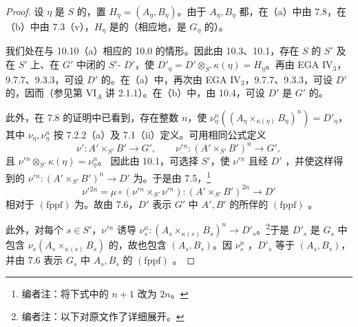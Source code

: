 \begin{proof}
设 $\eta$ 是 $S$ 的，置 $H_\eta=(A_\eta,B_\eta)$。由于 $A_\eta,B_\eta$ 都，在（a）中由 7.8，在（b）中由 7.3（v），$H_\eta$ 是的（相应地，是 $G_\eta$ 的）。

我们处在与 10.10（a）相应的 10.0 的情形。因此由 10.3、10.1，存在 $S$ 的 $S'$ 及在 $S'$ 上、在 $G'$ 中闭的 $S'$- $D'$，使 $D'_\eta=D'\otimes_{S'}\kappa(\eta)=H_\eta$。再由 EGA IV$_3$，9.7.7、9.3.3，可设 $D'$ 的。在（a）中，再次由 EGA IV$_3$，9.7.7、9.3.3，可设 $D'$ 的，因而（参见第 VI$_A$ 讲 2.1.1）。在（b）中，由 10.4，可设 $D'$ 是 $G'$ 的。

此外，在 7.8 的证明中已看到，存在整数 $n$，使 $\nu_\eta^n((A_\eta\times_{\kappa(\eta)}B_\eta)^n)=D'_\eta$，其中 $\nu_\eta,\nu_\eta^n$ 按 7.2.2（a）及 7.1（ii）定义。可用相同公式定义
\[
\nu':A'\times_{S'}B'\longrightarrow G',\qquad
\nu'{}^n:(A'\times_{S'}B')^n\longrightarrow G',
\]
且 $\nu'{}^n\otimes_{S'}\kappa(\eta)=\nu_\eta^n$。
因此由 10.1，可选择 $S'$，使 $\nu'{}^n$ 且经 $D'$ ，并使这样得到的 $\nu'{}^n:(A'\times_{S'}B')^n\to D'$ 为。于是由 7.5，\footnote{编者注：将下式中的 $n+1$ 改为 $2n$。}
\[
\nu'{}^{2n}=\mu\circ(\nu'{}^n\times_{S'}\nu'{}^n):(A'\times_{S'}B')^{2n}\longrightarrow D'
\]
相对于 $(\mathrm{fppf})$ 为。故由 7.6，$D'$ 表示 $G'$ 中 $A',B'$ 的所伴的 $(\mathrm{fppf})$ 。

此外，对每个 $s\in S'$，$\nu'{}^n$ 诱导 $\nu_s^n:(A_s\times_{\kappa(s)}B_s)^n\to D'_s$。\footnote{编者注：以下对原文作了详细展开。}于是 $D'_s$ 是 $G_s$ 中包含 $\nu_s(A_s\times_{\kappa(s)}B_s)$ 的，故也包含 $(A_s,B_s)$。因 $\nu_s^n$ ，$D'_s$ 等于 $(A_s,B_s)$，并由 7.6 表示 $G_s$ 中 $A_s,B_s$ 的 $(\mathrm{fppf})$ 。
\end{proof}

